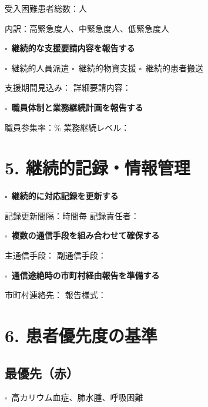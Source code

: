 \documentclass[a4paper,12pt]{jarticle}
\newcommand{\checkbox}{$\square$\ }
\newcommand{\underlinespace}[1]{\underline{\hspace{#1}}}
\begin{document}
\quad 受入困難患者総数：\underlinespace{2cm}人

\quad 内訳：高緊急度\underlinespace{2cm}人、中緊急度\underlinespace{2cm}人、低緊急度\underlinespace{2cm}人

\vspace{4mm}

\checkbox \textbf{継続的な支援要請内容を報告する}

\quad \checkbox 継続的人員派遣 \quad \checkbox 継続的物資支援 \quad \checkbox 継続的患者搬送

\quad 支援期間見込み：\underlinespace{4cm} \quad 詳細要請内容：\underlinespace{8cm}

\vspace{4mm}

\checkbox \textbf{職員体制と業務継続計画を報告する}

\quad 職員参集率：\underlinespace{2cm}\% \quad 業務継続レベル：\underlinespace{6cm}

\vspace{5mm}

\section*{5. 継続的記録・情報管理}

\checkbox \textbf{継続的に対応記録を更新する}

\quad 記録更新間隔：\underlinespace{2cm}時間毎 \quad 記録責任者：\underlinespace{4cm}

\vspace{3mm}

\checkbox \textbf{複数の通信手段を組み合わせて確保する}

\quad 主通信手段：\underlinespace{6cm} \quad 副通信手段：\underlinespace{6cm}

\vspace{3mm}

\checkbox \textbf{通信途絶時の市町村経由報告を準備する}

\quad 市町村連絡先：\underlinespace{8cm} \quad 報告様式：\underlinespace{4cm}

\vspace{5mm}

\section*{6. 患者優先度の基準}

\subsection*{最優先（赤）}
\checkbox 高カリウム血症、肺水腫、呼吸困難
\end{document}
